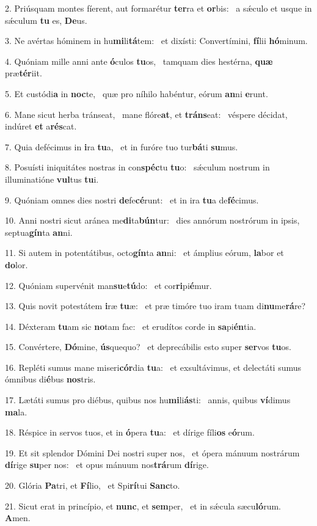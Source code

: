2. Priúsquam montes fíerent, aut formarétur \textbf{ter}ra et \textbf{or}bis: \ast\  a sǽculo et usque in sǽculum \textbf{tu} es, \textbf{De}us.\

3. Ne avértas hóminem in hu\textbf{mi}li\textbf{tá}tem: \ast\  et dixísti: Convertímini, \textbf{fí}lii \textbf{hó}minum.\

4. Quóniam mille anni ante \textbf{ó}culos \textbf{tu}os, \ast\  tamquam dies hestérna, \textbf{quæ} præ\textbf{tér}iit.\

5. Et custódi\textbf{a} in \textbf{noc}te, \ast\  quæ pro níhilo habéntur, eórum \textbf{an}ni \textbf{e}runt.\

6. Mane sicut herba tránseat, \dag\  mane flóre\textbf{at}, et \textbf{tráns}eat: \ast\  véspere décidat, indúret \textbf{et} a\textbf{rés}cat.\

7. Quia defécimus in \textbf{i}ra \textbf{tu}a, \ast\  et in furóre tuo tur\textbf{bá}ti \textbf{su}mus.\

8. Posuísti iniquitátes nostras in con\textbf{spéc}tu \textbf{tu}o: \ast\  sǽculum nostrum in illuminatióne \textbf{vul}tus \textbf{tu}i.\

9. Quóniam omnes dies nostri \textbf{de}fe\textbf{cé}runt: \ast\  et in ira \textbf{tu}a de\textbf{fé}cimus.\

10. Anni nostri sicut aránea me\textbf{di}ta\textbf{bún}tur: \ast\  dies annórum nostrórum in ipsis, septua\textbf{gín}ta \textbf{an}ni.\

11. Si autem in potentátibus, octo\textbf{gín}ta \textbf{an}ni: \ast\  et ámplius eórum, \textbf{la}bor et \textbf{do}lor.\

12. Quóniam supervénit man\textbf{su}e\textbf{tú}do: \ast\  et cor\textbf{ri}pi\textbf{é}mur.\

13. Quis novit potestátem \textbf{i}ræ \textbf{tu}æ: \ast\  et præ timóre tuo iram tuam di\textbf{nu}me\textbf{rá}re?\

14. Déxteram \textbf{tu}am sic \textbf{no}tam fac: \ast\  et erudítos corde in \textbf{sa}pi\textbf{én}tia.\

15. Convértere, \textbf{Dó}mine, \textbf{ús}quequo? \ast\  et deprecábilis esto super \textbf{ser}vos \textbf{tu}os.\

16. Repléti sumus mane miseri\textbf{cór}dia \textbf{tu}a: \ast\  et exsultávimus, et delectáti sumus ómnibus di\textbf{é}bus \textbf{nos}tris.\

17. Lætáti sumus pro diébus, quibus nos hu\textbf{mi}li\textbf{ás}ti: \ast\  annis, quibus \textbf{ví}dimus \textbf{ma}la.\

18. Réspice in servos tuos, et in \textbf{ó}pera \textbf{tu}a: \ast\  et dírige fíli\textbf{os} e\textbf{ó}rum.\

19. Et sit splendor Dómini Dei nostri super nos, \dag\  et ópera mánuum nostrárum \textbf{dí}rige \textbf{su}per nos: \ast\  et opus mánuum nos\textbf{trá}rum \textbf{dí}rige.\

20. Glória \textbf{Pa}tri, et \textbf{Fí}lio, \ast\  et Spi\textbf{rí}tui \textbf{Sanc}to.\

21. Sicut erat in princípio, et \textbf{nunc}, et \textbf{sem}per, \ast\  et in sǽcula sæcu\textbf{ló}rum. \textbf{A}men.\

